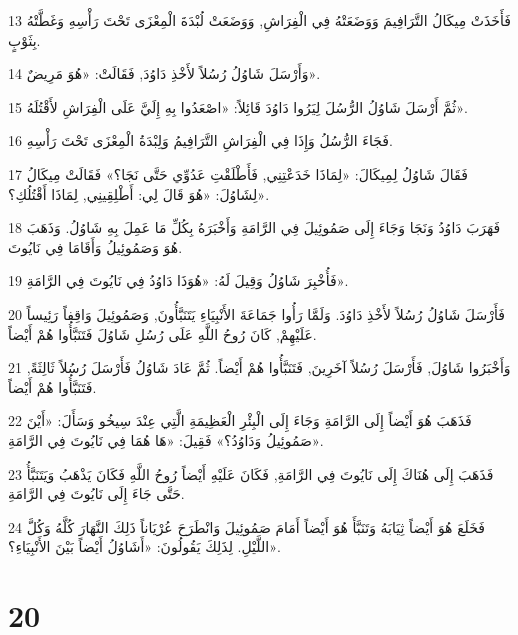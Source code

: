 \par 13 فَأَخَذَتْ مِيكَالُ التَّرَافِيمَ وَوَضَعَتْهُ فِي الْفِرَاشِ, وَوَضَعَتْ لُبْدَةَ الْمِعْزَى تَحْتَ رَأْسِهِ وَغَطَّتْهُ بِثَوْبٍ.
\par 14 وَأَرْسَلَ شَاوُلُ رُسُلاً لأَخْذِ دَاوُدَ, فَقَالَتْ: «هُوَ مَرِيضٌ».
\par 15 ثُمَّ أَرْسَلَ شَاوُلُ الرُّسُلَ لِيَرُوا دَاوُدَ قَائِلاً: «اصْعَدُوا بِهِ إِلَيَّ عَلَى الْفِرَاشِ لأَقْتُلَهُ».
\par 16 فَجَاءَ الرُّسُلُ وَإِذَا فِي الْفِرَاشِ التَّرَافِيمُ وَلِبْدَةُ الْمِعْزَى تَحْتَ رَأْسِهِ.
\par 17 فَقَالَ شَاوُلُ لِمِيكَالَ: «لِمَاذَا خَدَعْتِنِي, فَأَطْلَقْتِ عَدُوِّي حَتَّى نَجَا؟» فَقَالَتْ مِيكَالُ لِشَاوُلَ: «هُوَ قَالَ لِي: أَطْلِقِينِي, لِمَاذَا أَقْتُلُكِ؟».
\par 18 فَهَرَبَ دَاوُدُ وَنَجَا وَجَاءَ إِلَى صَمُوئِيلَ فِي الرَّامَةِ وَأَخْبَرَهُ بِكُلِّ مَا عَمِلَ بِهِ شَاوُلُ. وَذَهَبَ هُوَ وَصَمُوئِيلُ وَأَقَامَا فِي نَايُوتَ.
\par 19 فَأُخْبِرَ شَاوُلُ وَقِيلَ لَهُ: «هُوَذَا دَاوُدُ فِي نَايُوتَ فِي الرَّامَةِ».
\par 20 فَأَرْسَلَ شَاوُلُ رُسُلاً لأَخْذِ دَاوُدَ. وَلَمَّا رَأُوا جَمَاعَةَ الأَنْبِيَاءِ يَتَنَبَّأُونَ, وَصَمُوئِيلَ وَاقِفاً رَئِيساً عَلَيْهِمْ, كَانَ رُوحُ اللَّهِ عَلَى رُسُلِ شَاوُلَ فَتَنَبَّأُوا هُمْ أَيْضاً.
\par 21 وَأَخْبَرُوا شَاوُلَ, فَأَرْسَلَ رُسُلاً آخَرِينَ, فَتَنَبَّأُوا هُمْ أَيْضاً. ثُمَّ عَادَ شَاوُلُ فَأَرْسَلَ رُسُلاً ثَالِثَةً, فَتَنَبَّأُوا هُمْ أَيْضاً.
\par 22 فَذَهَبَ هُوَ أَيْضاً إِلَى الرَّامَةِ وَجَاءَ إِلَى الْبِئْرِ الْعَظِيمَةِ الَّتِي عِنْدَ سِيخُو وَسَأَلَ: «أَيْنَ صَمُوئِيلُ وَدَاوُدُ؟» فَقِيلَ: «هَا هُمَا فِي نَايُوتَ فِي الرَّامَةِ».
\par 23 فَذَهَبَ إِلَى هُنَاكَ إِلَى نَايُوتَ فِي الرَّامَةِ, فَكَانَ عَلَيْهِ أَيْضاً رُوحُ اللَّهِ فَكَانَ يَذْهَبُ وَيَتَنَبَّأُ حَتَّى جَاءَ إِلَى نَايُوتَ فِي الرَّامَةِ.
\par 24 فَخَلَعَ هُوَ أَيْضاً ثِيَابَهُ وَتَنَبَّأَ هُوَ أَيْضاً أَمَامَ صَمُوئِيلَ وَانْطَرَحَ عُرْيَاناً ذَلِكَ النَّهَارَ كُلَّهُ وَكُلَّ اللَّيْلِ. لِذَلِكَ يَقُولُونَ: «أَشَاوُلُ أَيْضاً بَيْنَ الأَنْبِيَاءِ؟».

\chapter{20}

